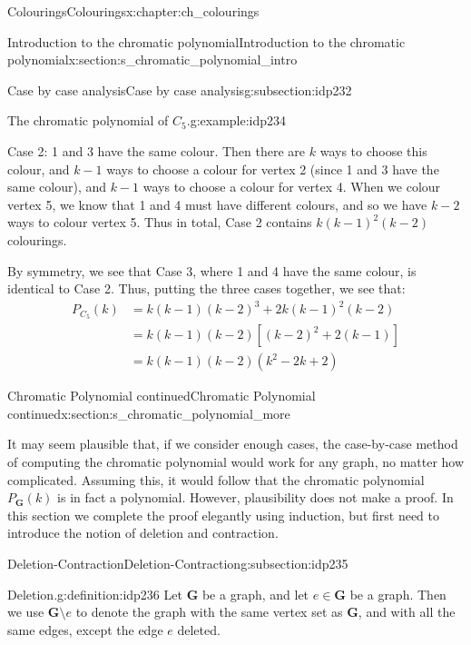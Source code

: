 \documentclass[oneside,10pt,]{book}
\numberwithin{equation}{section}
\newcommand{\bfG}{\mathbf{G}}
\newcommand{\amp}{&}
\begin{document}
\begin{chapterptx}{Colourings}{}{Colourings}{}{}{x:chapter:ch_colourings}
\begin{sectionptx}{Introduction to the chromatic polynomial}{}{Introduction to the chromatic polynomial}{}{}{x:section:s_chromatic_polynomial_intro}
\begin{subsectionptx}{Case by case analysis}{}{Case by case analysis}{}{}{g:subsection:idp232}
\begin{example}{The chromatic polynomial of \(C_5\).}{g:example:idp234}
\par
Case 2: 1 and 3 have the same colour. Then there are \(k\) ways to choose this colour, and \(k-1\) ways to choose a colour for vertex 2 (since 1 and 3 have the same colour), and \(k-1\) ways to choose a colour for vertex 4.  When we colour vertex 5, we know that 1 and 4 must have different colours, and so we have \(k-2\) ways to colour vertex 5.  Thus in total, Case 2 contains \(k(k-1)^2(k-2)\) colourings.%
\par
By symmetry, we see that Case 3, where 1 and 4 have the same colour, is identical to Case 2.  Thus, putting the three cases together, we see that:%
%
\begin{align*}
P_{C_5}(k)\amp=k(k-1)(k-2)^3+2k(k-1)^2(k-2)\\
\amp=k(k-1)(k-2)[(k-2)^2+2(k-1)]\\
\amp=k(k-1)(k-2)(k^2-2k+2)
\end{align*}
\end{example}
\end{subsectionptx}
\end{sectionptx}
%
%
\typeout{************************************************}
\typeout{************************************************}
%
\begin{sectionptx}{Chromatic Polynomial continued}{}{Chromatic Polynomial continued}{}{}{x:section:s_chromatic_polynomial_more}
\begin{introduction}{}%
It may seem plausible that, if we consider enough cases, the case-by-case method of computing the chromatic polynomial would work for any graph, no matter how complicated.  Assuming this, it would follow that the chromatic polynomial \(P_\bfG(k)\) is in fact a polynomial.  However, plausibility does not make a proof.  In this section we complete the proof elegantly using induction, but first need to introduce the notion of deletion and contraction.%
\end{introduction}%
%
%
\typeout{************************************************}
\typeout{************************************************}
%
\begin{subsectionptx}{Deletion-Contraction}{}{Deletion-Contraction}{}{}{g:subsection:idp235}
\begin{definition}{Deletion.}{g:definition:idp236}%
Let \(\bfG\) be a graph, and let \(e\in\bfG\) be a graph.  Then we use \(\bfG\setminus e\) to denote the graph with the same vertex set as \(\bfG\), and with all the same edges, except the edge \(e\) deleted.%

\end{definition}
\end{subsectionptx}
\end{sectionptx}
\end{chapterptx}
\end{document}
